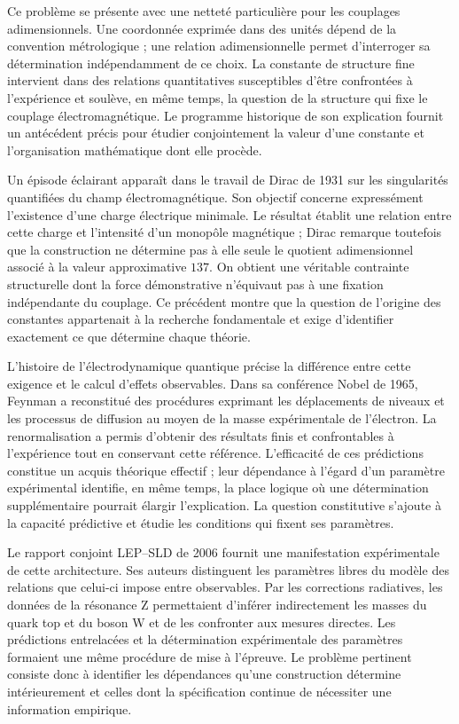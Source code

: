Ce problème se présente avec une netteté particulière pour les couplages adimensionnels.
Une coordonnée exprimée dans des unités dépend de la convention métrologique ;
une relation adimensionnelle permet d'interroger sa détermination
indépendamment de ce choix. La constante de structure fine intervient
dans des relations quantitatives susceptibles d'être confrontées à l'expérience et soulève, en même temps, la question
de la structure qui fixe le couplage électromagnétique. Le programme
historique de son explication fournit un antécédent précis pour
étudier conjointement la valeur d'une constante et l'organisation
mathématique dont elle procède.

Un épisode éclairant apparaît dans le travail de Dirac de 1931 sur les
singularités quantifiées du champ électromagnétique. Son objectif concerne
expressément l'existence d'une charge électrique minimale. Le
résultat établit une relation entre cette charge et l'intensité d'un
monopôle magnétique ; Dirac remarque toutefois que la construction ne
détermine pas à elle seule le quotient adimensionnel associé à la valeur
approximative \(137\)\cite{dirac1931}. On obtient une véritable contrainte structurelle
dont la force démonstrative n'équivaut pas à une fixation indépendante
du couplage. Ce précédent montre que la question de l'origine
des constantes appartenait à la recherche fondamentale et exige
d'identifier exactement ce que détermine chaque théorie.

L'histoire de l'électrodynamique quantique précise la différence entre
cette exigence et le calcul d'effets observables. Dans sa conférence Nobel
de 1965, Feynman a reconstitué des procédures exprimant les déplacements
de niveaux et les processus de diffusion au moyen de la masse expérimentale de
l'électron\cite{feynman1965}. La renormalisation a permis d'obtenir
des résultats finis et confrontables à l'expérience tout en conservant cette référence. L'efficacité
de ces prédictions constitue un acquis théorique effectif ; leur dépendance
à l'égard d'un paramètre expérimental identifie, en même temps, la place logique
où une détermination supplémentaire pourrait élargir l'explication. La
question constitutive s'ajoute à la capacité prédictive et étudie les
conditions qui fixent ses paramètres.

Le rapport conjoint LEP--SLD de 2006 fournit une manifestation expérimentale
de cette architecture\cite{lep2006}. Ses auteurs distinguent les paramètres
libres du modèle des relations que celui-ci impose entre observables.
Par les corrections radiatives, les données de la résonance Z permettaient
d'inférer indirectement les masses du quark top et du boson W et de les confronter
aux mesures directes. Les prédictions entrelacées et la détermination
expérimentale des paramètres formaient une même procédure de mise à l'épreuve.
Le problème pertinent consiste donc à identifier les dépendances qu'une
construction détermine intérieurement et celles dont la spécification continue
de nécessiter une information empirique.

